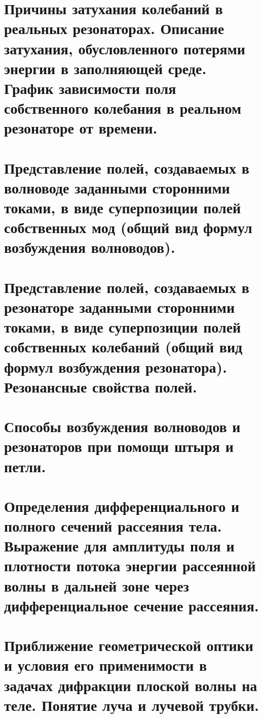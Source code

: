 \begin{multicols*}{2}
		\section{Причины затухания колебаний в реальных резонаторах. Описание затухания, обусловленного потерями энергии в заполняющей среде. График зависимости поля собственного колебания в реальном резонаторе от времени.}
		
		\section{Представление полей, создаваемых в волноводе заданными сторонними токами, в виде суперпозиции полей собственных мод (общий вид формул возбуждения волноводов).}
		
		\section{Представление полей, создаваемых в резонаторе заданными сторонними токами, в виде суперпозиции полей собственных колебаний (общий вид формул возбуждения резонатора). Резонансные свойства полей. }
		
		\section{Способы возбуждения волноводов и резонаторов при помощи штыря и петли.}
		
		\section{Определения дифференциального и полного сечений рассеяния тела. Выражение для амплитуды поля и плотности потока энергии рассеянной волны в дальней зоне через дифференциальное сечение рассеяния. }
		
		\section{Приближение геометрической оптики и условия его применимости в задачах дифракции плоской волны на теле. Понятие луча и лучевой трубки. }
		
	\end{multicols*}
